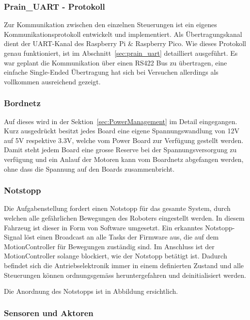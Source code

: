 \documentclass[main.tex]{subfiles} %
\begin{document}
\subsubsection{Prain\_UART - Protokoll}

Zur Kommunikation zwischen den einzelnen Steuerungen ist ein eigenes
Kommunikationsprotokoll entwickelt und implementiert. Als Übertragungskanal
dient der UART-Kanal des Raspberry Pi \& Raspberry Pico. Wie dieses Protokoll
genau funktioniert, ist im Abschnitt~\ref{sec:prain_uart} detailliert
ausgeführt. Es war geplant die Kommunikation über einen RS422 Bus zu
übertragen, eine einfache Single-Ended Übertragung hat sich bei Versuchen
allerdings als vollkommen ausreichend gezeigt.

\subsubsection*{Bordnetz}

Auf dieses wird in der Sektion~\ref{sec:PowerManagement} im Detail eingegangen.
Kurz ausgedrückt besitzt jedes Board eine eigene Spannungswandlung von 12V auf
5V respektive 3.3V, welche vom Power Board zur Verfügung gestellt werden. Damit
steht jedem Board eine grosse Reserve bei der Spannungsversorgung zu verfügung
und ein Anlauf der Motoren kann vom Boardnetz abgefangen werden, ohne dass die
Spannung auf den Boards zusammenbricht.

\subsubsection*{Notstopp}

Die Aufgabenstellung fordert einen Notstopp für das gesamte System, durch
welchen alle gefährlichen Bewegungen des Roboters eingestellt werden. In diesem
Fahrzeug ist dieser in Form von Software umgesetzt. Ein erkanntes
Notstopp-Signal löst einen Broadcast an alle Tasks der Firmware aus, die auf
dem MotionController für Bewegungen zuständig sind. Im Anschluss ist der
MotionController solange blockiert, wie der Notstopp betätigt ist. Dadurch
befindet sich die Antriebselektronik immer in einem definierten Zustand und
alle Steuerungen können ordnungsgemäss heruntergefahren und deinitialisiert
werden.

Die Anordnung des Notstopps ist in Abbildung ersichtlich. %

\subsubsection*{Sensoren und Aktoren}
\end{document}
